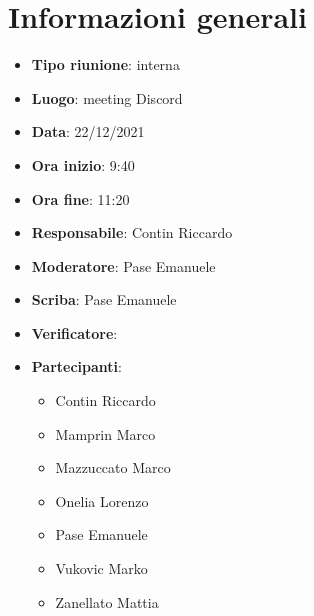 \section{Informazioni generali}
\begin{itemize}
  \item \textbf{Tipo riunione}: interna
  \item \textbf{Luogo}: meeting Discord
  \item \textbf{Data}: 22/12/2021
  \item \textbf{Ora inizio}: 9:40
  \item \textbf{Ora fine}: 11:20
  \item \textbf{Responsabile}: Contin Riccardo
  \item \textbf{Moderatore}: Pase Emanuele
  \item \textbf{Scriba}: Pase Emanuele
  \item \textbf{Verificatore}: 
  \item \textbf{Partecipanti}:
  \begin{itemize}
    \item Contin Riccardo
    \item Mamprin Marco
    \item Mazzuccato Marco
    \item Onelia Lorenzo
    \item Pase Emanuele
    \item Vukovic Marko
    \item Zanellato Mattia
  \end{itemize}
\end{itemize}

